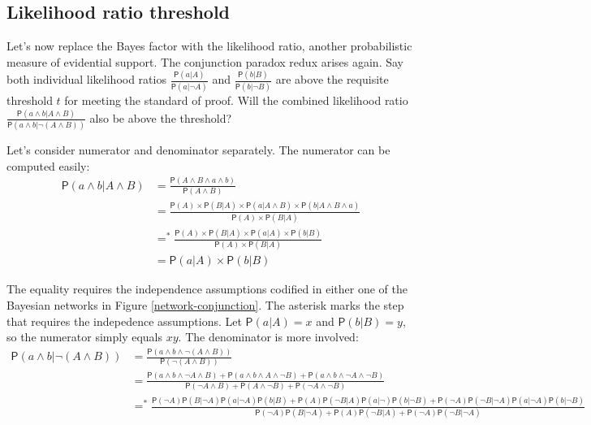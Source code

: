 \documentclass[10pt,dvipsnames,enabledeprecatedfontcommands]{scrartcl}
\newcommand{\et}{\wedge}
\newcommand{\pr}[1]{\mathsf{P}(#1)}
\begin{document}
\hypertarget{likelihood-ratio-threshold}{%
\subsection{Likelihood ratio
threshold}\label{likelihood-ratio-threshold}}

Let's now replace the Bayes factor with the likelihood ratio, another
probabilistic measure of evidential support. The conjunction paradox
redux arises again. Say both individual likelihood ratios
\(\frac{\pr{a |A}}{\pr{a | \neg A}}\) and
\(\frac{\pr{b |B}}{\pr{b | \neg B}}\) are above the requisite threshold
\(t\) for meeting the standard of proof. Will the combined likelihood
ratio \(\frac{\pr{ a \et b |A \et B}}{\pr{a \et b | \neg (A \et B)}}\)
also be above the threshold?

Let's consider numerator and denominator separately. The numerator can
be computed easily: \begin{align*}
\pr{a \wedge b| A\wedge B} & =  \frac{\pr{A \et B \et a\et b}}{\pr{A \et B}}\\
&= \frac{   \pr{A} \times \pr{B|A} \times \pr{a | A \wedge B} \times \pr{b | A \wedge B \wedge a} }{\pr{A} \times \pr{B \vert A}}\\
& =^* \frac{\pr{A} \times \pr{B | A} \times \pr{a | A} \times \pr{b | B}}{\pr{A}  \times \pr{B | A}} \\
& = \pr{a | A} \times \pr{b | B} 
 \end{align*}

\noindent The equality requires the independence assumptions codified in
either one of the Bayesian networks in Figure \ref{network-conjunction}.
The asterisk marks the step that requires the indepedence assumptions.
Let \(\pr{a |A}=x\) and \(\pr{b |B}=y\), so the numerator simply equals
\(xy\). The denominator is more involved: \begin{align*}
\pr{a \et b| \neg (A\et B)} & = \frac{\pr{a \et b \et \neg (A\et B)}}{\pr{\neg (A \et B)}} \\
& = \frac{\pr{a \et b \et \neg A\et B} +  \pr{a \et b \et A\et \neg B} + \pr{a \et b \et \neg A\et \neg B}  }{\pr{\neg A \et B} + \pr{A \et \neg B} + \pr{\neg A \et \neg B} } \\
& =^* \frac{\pr{\neg A}\pr{B \vert \neg A} \pr{a | \neg A}\pr{b | B} + \pr{A}\pr{\neg B \vert A} \pr{a | \neg }\pr{b | \neg B} + \pr{\neg A}\pr{\neg B \vert \neg A } \pr{a | \neg A}\pr{b | \neg B}}{\pr{\neg A}\pr{B \vert \neg A} + \pr{A}\pr{\neg B \vert A } + \pr{\neg A}\pr{\neg B \vert \neg A} }  
 \end{align*}
\end{document}
